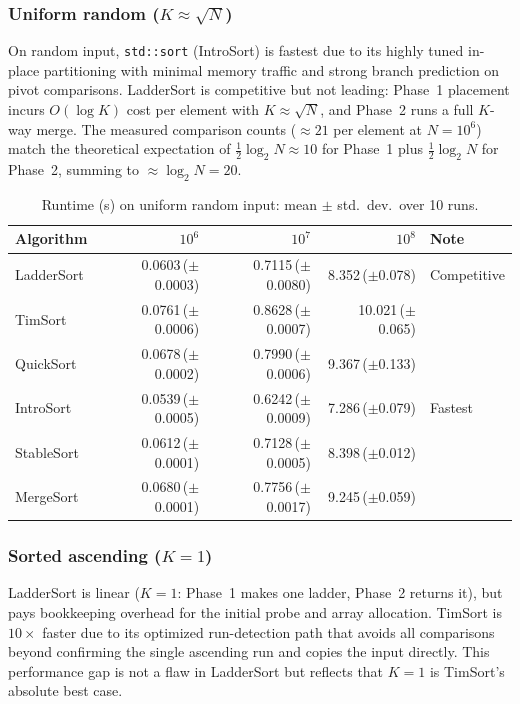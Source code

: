 \documentclass[12pt,a4paper]{article}
\theoremstyle{plain}
\theoremstyle{definition}
\begin{document}
\subsubsection{Uniform random ($K \approx \sqrt{N}$)}
On random input, \texttt{std::sort} (IntroSort) is fastest due to its
highly tuned in-place partitioning with minimal memory traffic and strong
branch prediction on pivot comparisons.  LadderSort is competitive but not
leading: Phase~1 placement incurs $O(\log K)$ cost per element with
$K \approx \sqrt{N}$, and Phase~2 runs a full $K$-way merge.  The measured
comparison counts ($\approx 21$ per element at $N=10^6$) match the
theoretical expectation of $\frac{1}{2}\log_2 N \approx 10$ for Phase~1
plus $\frac{1}{2}\log_2 N$ for Phase~2, summing to $\approx \log_2 N = 20$.

\begin{table}[H]
\centering\small
\caption{Runtime (s) on uniform random input: mean $\pm$ std.\ dev.\ over 10 runs.}
\begin{tabularx}{\linewidth}{@{}lrrrX@{}}
\toprule
Algorithm & $10^6$ & $10^7$ & $10^8$ & Note \\
\midrule
LadderSort     & 0.0603\,($\pm$0.0003) & 0.7115\,($\pm$0.0080) & 8.352\,($\pm$0.078) & Competitive \\
TimSort        & 0.0761\,($\pm$0.0006) & 0.8628\,($\pm$0.0007) & 10.021\,($\pm$0.065) & \\
QuickSort      & 0.0678\,($\pm$0.0002) & 0.7990\,($\pm$0.0006) & 9.367\,($\pm$0.133) & \\
IntroSort      & 0.0539\,($\pm$0.0005) & 0.6242\,($\pm$0.0009) & 7.286\,($\pm$0.079) & Fastest \\
StableSort     & 0.0612\,($\pm$0.0001) & 0.7128\,($\pm$0.0005) & 8.398\,($\pm$0.012) & \\
MergeSort      & 0.0680\,($\pm$0.0001) & 0.7756\,($\pm$0.0017) & 9.245\,($\pm$0.059) & \\
\bottomrule
\end{tabularx}
\end{table}

\subsubsection{Sorted ascending ($K=1$)}
LadderSort is linear ($K=1$: Phase~1 makes one ladder, Phase~2 returns it),
but pays bookkeeping overhead for the initial probe and array allocation.
TimSort is $10\times$ faster due to its optimized run-detection path that
avoids all comparisons beyond confirming the single ascending run and copies
the input directly.  This performance gap is not a flaw in LadderSort but
reflects that $K=1$ is TimSort's absolute best case.
\end{document}
